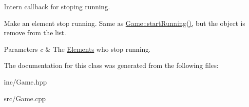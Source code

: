 Intern callback for stoping running. 

Make an element stop running. Same as \hyperlink{class_game_a27ad8f2a6f8f098cc28377df13c4ec2e}{Game\+::start\+Running()}, but the object is remove from the list. 
\begin{DoxyParams}{Parameters}
{\em c} & The \hyperlink{class_elements}{Elements} who stop running. \\
\hline
\end{DoxyParams}


The documentation for this class was generated from the following files\+:\begin{DoxyCompactItemize}
\item 
inc/Game.\+hpp\item 
src/Game.\+cpp\end{DoxyCompactItemize}
